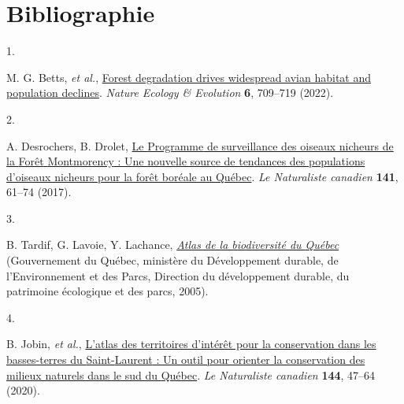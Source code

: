 \documentclass[9pt,twocolumn,twoside,]{pnas-new}
\newlength{\cslhangindent}
\newlength{\csllabelwidth}
\newlength{\cslentryspacingunit} %
\newenvironment{CSLReferences}[2] %
 {%
  \setlength{\parindent}{0pt}
  \ifodd #1
  \let\oldpar\par
  \def\par{\hangindent=\cslhangindent\oldpar}
  \fi
  \setlength{\parskip}{#2\cslentryspacingunit}
 }%
 {}
\newcommand{\CSLLeftMargin}[1]{\parbox[t]{\csllabelwidth}{#1}}
\newcommand{\CSLRightInline}[1]{\parbox[t]{\linewidth - \csllabelwidth}{#1}\break}
\begin{document}
\hypertarget{bibliographie}{%
\section*{Bibliographie}\label{bibliographie}}

\hypertarget{refs}{}
\begin{CSLReferences}{0}{0}
\leavevmode{}%
\CSLLeftMargin{1. }%
\CSLRightInline{M. G. Betts, \emph{et al.},
\href{https://doi.org/10.1038/s41559-022-01737-8}{Forest degradation
drives widespread avian habitat and population declines}. \emph{Nature
Ecology \& Evolution} \textbf{6}, 709--719 (2022).}

\leavevmode{}%
\CSLLeftMargin{2. }%
\CSLRightInline{A. Desrochers, B. Drolet,
\href{https://doi.org/10.7202/1039737ar}{Le {Programme} de surveillance
des oiseaux nicheurs de la {Forêt} {Montmorency} : Une nouvelle source
de tendances des populations d'oiseaux nicheurs pour la forêt boréale au
{Québec}}. \emph{Le Naturaliste canadien} \textbf{141}, 61--74 (2017).}

\leavevmode{}%
\CSLLeftMargin{3. }%
\CSLRightInline{B. Tardif, G. Lavoie, Y. Lachance,
\emph{\href{https://belsp.uqtr.ca/id/eprint/1230/1/Tardif\%20et\%20al_2005_Esp\%C3\%A8ces_menac\%C3\%A9es_vuln\%C3\%A9rables.pdf}{Atlas
de la biodiversité du {Québec}}} (Gouvernement du Québec, ministère du
Développement durable, de l'Environnement et des Parcs, Direction du
développement durable, du patrimoine écologique et des parcs, 2005).}

\leavevmode{}%
\CSLLeftMargin{4. }%
\CSLRightInline{B. Jobin, \emph{et al.},
\href{https://doi.org/10.7202/1073990ar}{L'atlas des territoires
d'intérêt pour la conservation dans les basses-terres du
{Saint}-{Laurent} : Un outil pour orienter la conservation des milieux
naturels dans le sud du {Québec}}. \emph{Le Naturaliste canadien}
\textbf{144}, 47--64 (2020).}

\end{CSLReferences}



% 
\end{document}
